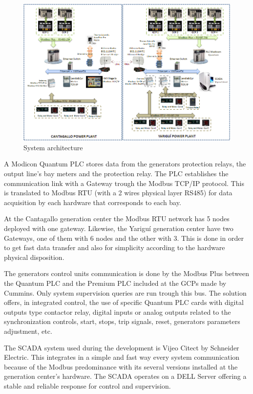 \begin{figure}
  \centering
  \includegraphics[width=1.0\textwidth]{img/arch.png}
  \caption{System architecture}
  \label{fig:arch}
\end{figure}

A Modicon Quantum PLC stores data from the generators protection
relays, the output line's bay meters and the protection relay. The PLC
establishes the communication link with a Gateway trough the Modbus
TCP/IP protocol. This is translated to Modbus RTU (with a 2 wires
physical layer RS485) for data acquisition by each hardware that
corresponds to each bay.

At the Cantagallo generation center the Modbus RTU network has 5 nodes
deployed with one gateway. Likewise, the Yariguí generation center 
have two Gateways, one of them  with 6 nodes and the other with 3. 
This is done  in order to get fast data transfer and also for simplicity 
according to the hardware physical disposition.

The generators control units communication is done by the Modbus Plus
between the Quantum PLC and the Premium PLC included at the GCPs made
by Cummins. Only system supervision queries are run trough this bus.
The solution offers, in integrated control, the use of specific
Quantum PLC cards with digital outputs type contactor relay, digital inputs or
analog outputs related to the synchronization controls, start, stops,
trip signals, reset, generators parameters adjustment, etc.

The SCADA system used during the development is Vijeo Citect by
Schneider Electric. This integrates in a simple and fast way every
system communication because of the Modbus predominance with its
several versions installed at the generation center's hardware. The
SCADA operates on a DELL Server offering a stable and reliable
response for control and supervision.

